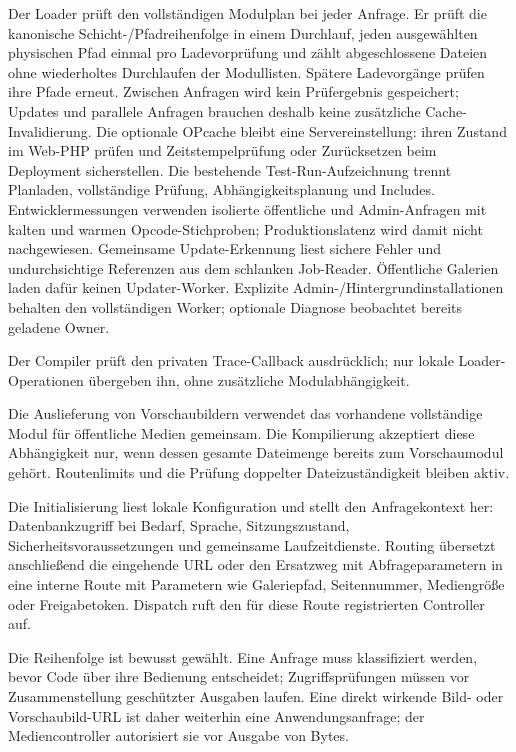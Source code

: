 \documentclass[11pt,a4paper]{article}
\begin{document}
Der Loader prüft den vollständigen Modulplan bei jeder Anfrage. Er prüft die
kanonische Schicht-/Pfadreihenfolge in einem Durchlauf, jeden ausgewählten
physischen Pfad einmal pro Ladevorprüfung und zählt abgeschlossene Dateien
ohne wiederholtes Durchlaufen der Modullisten. Spätere Ladevorgänge prüfen ihre
Pfade erneut. Zwischen Anfragen wird kein Prüfergebnis gespeichert; Updates
und parallele Anfragen brauchen deshalb keine zusätzliche Cache-Invalidierung.
Die optionale OPcache bleibt eine Servereinstellung: ihren Zustand im Web-PHP
prüfen und Zeitstempelprüfung oder Zurücksetzen beim Deployment sicherstellen.
Die bestehende Test-Run-Aufzeichnung trennt Planladen, vollständige Prüfung,
Abhängigkeitsplanung und Includes. Entwicklermessungen verwenden isolierte
öffentliche und Admin-Anfragen mit kalten und warmen Opcode-Stichproben;
Produktionslatenz wird damit nicht nachgewiesen.
Gemeinsame Update-Erkennung liest sichere Fehler und undurchsichtige
Referenzen aus dem schlanken Job-Reader. Öffentliche Galerien laden dafür
keinen Updater-Worker. Explizite Admin-/Hintergrundinstallationen behalten den
vollständigen Worker; optionale Diagnose beobachtet bereits geladene Owner.

Der Compiler prüft den privaten Trace-Callback ausdrücklich; nur lokale
Loader-Operationen übergeben ihn, ohne zusätzliche Modulabhängigkeit.

Die Auslieferung von Vorschaubildern verwendet das vorhandene vollständige
Modul für öffentliche Medien gemeinsam. Die Kompilierung akzeptiert diese
Abhängigkeit nur, wenn dessen gesamte Dateimenge bereits zum Vorschaumodul
gehört. Routenlimits und die Prüfung doppelter Dateizuständigkeit bleiben aktiv.

Die Initialisierung liest lokale Konfiguration und stellt den Anfragekontext
her: Datenbankzugriff bei Bedarf, Sprache, Sitzungszustand,
Sicherheitsvoraussetzungen und gemeinsame Laufzeitdienste. Routing übersetzt
anschließend die eingehende URL oder den Ersatzweg mit Abfrageparametern in eine
interne Route mit Parametern wie Galeriepfad, Seitennummer, Mediengröße oder
Freigabetoken. Dispatch ruft den für diese Route registrierten Controller auf.

Die Reihenfolge ist bewusst gewählt. Eine Anfrage muss klassifiziert werden,
bevor Code über ihre Bedienung entscheidet; Zugriffsprüfungen müssen vor
Zusammenstellung geschützter Ausgaben laufen. Eine direkt wirkende Bild- oder
Vorschaubild-URL ist daher weiterhin eine Anwendungsanfrage; der
Mediencontroller autorisiert sie vor Ausgabe von Bytes.
\end{document}
